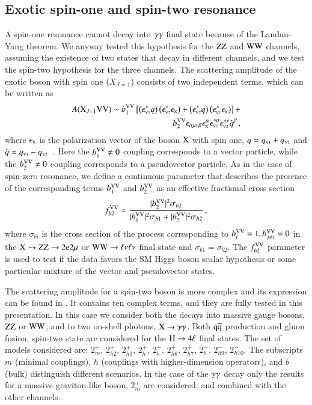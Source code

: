 \subsection{Exotic spin-one and spin-two resonance}
A spin-one resonance cannot decay into $\gamma\gamma$ final state because
of the Landau-Yang theorem. We anyway tested this hypothesis for the
$\mathrm{Z}\mathrm{Z}$ and $\mathrm{W}\mathrm{W}$ channels, assuming the existence of two states
that decay in different channels, and we test the spin-two hypothesis
for the three channels.  The scattering amplitude of the exotic boson
with spin one ($X_{J=1}$) consists of two independent terms, which can
be written as
%
\begin{eqnarray}
A(\mathrm{X}_{J=1} \mathrm{V}\mathrm{V}) \sim b_{1}^{\mathrm{V}\mathrm{V}}  \left[ \left(\epsilon_{\scriptscriptstyle\mathrm{V}1}^{*}q\right)\left(\epsilon_{\scriptscriptstyle\mathrm{V}2}^{*}\epsilon_{\scriptscriptstyle\mathrm{X}}\right) +
\left(\epsilon_{\scriptscriptstyle\mathrm{V}2}^{*}q\right)\left(\epsilon_{\scriptscriptstyle\mathrm{V}1}^{*}\epsilon_{\scriptscriptstyle\mathrm{X}}\right) \right] + \\ \nonumber 
b_{2}^{\mathrm{V}\mathrm{V}}  \epsilon_{\alpha\mu\nu\beta}\epsilon_{\scriptscriptstyle\mathrm{X}}^{\alpha}\epsilon_{\scriptscriptstyle\mathrm{V}1}^{*\mu}\epsilon_{\scriptscriptstyle\mathrm{V}2}^{*\nu}{\tilde q}^{\beta} \,,
\label{eq:ampl-spin1} 
\end{eqnarray}
%
where $\epsilon_{\scriptscriptstyle\mathrm{X}}$ is the polarization vector of the boson $\mathrm{X}$
with spin one, ${q}=q_{\scriptscriptstyle\mathrm{V}1}+q_{\scriptscriptstyle\mathrm{V}2}$ and ${\tilde
  q}=q_{\scriptscriptstyle\mathrm{V}1}-q_{\scriptscriptstyle\mathrm{V}2}$~\cite{Gao:2010qx, Bolognesi:2012mm}.
Here the $b_{1}^{\mathrm{V}\mathrm{V}} \neq 0$ coupling corresponds to a vector
particle, while the $b_{2}^{\mathrm{V}\mathrm{V}}\neq 0$ coupling corresponds to a
pseudovector particle.
As in the case of spin-zero resonance, we define a continuous parameter
that describes the presence of the corresponding terms $b_{1}^{\mathrm{V}\mathrm{V}} $ and 
$b_{2}^{\mathrm{V}\mathrm{V}}$ as an effective fractional cross section
%
\begin{eqnarray}
f_{b2}^{\mathrm{V}\mathrm{V}}  = \frac{|b_{2}^{\mathrm{V}\mathrm{V}} |^2 \sigma_{b2}}{|b_{1}^{\mathrm{V}\mathrm{V}} |^2 \sigma_{b1} + |b_{2}^{\mathrm{V}\mathrm{V}}|^2 \sigma_{b2}} \,,
\label{eq:fa_definitions_spin1}
\end{eqnarray}
%
where $\sigma_{bi}$ is the cross section of the process corresponding 
to $b_{i}^{\mathrm{V}\mathrm{V}}  = 1, b^{\mathrm{V}\mathrm{V}}_{j \neq i} = 0$ in the 
$\mathrm{X}\to\mathrm{Z}\mathrm{Z}\to2\mathrm{e}2\mu$ or $\mathrm{W}\mathrm{W}\to\ell\nu\ell\nu$ final state and $\sigma_{b1} = \sigma_{b2}$.
The $f_{b2}^{\mathrm{V}\mathrm{V}}$ parameter is used to test if the data favors the SM Higgs boson 
scalar hypothesis or some particular mixture of the vector and pseudovector states.

The scattering amplitude for a spin-two boson is more complex and its
expression can be found in \cite{PASICHEP14}.  It contains ten complex
terms, and they are fully tested in this presentation.  In this case
we consider both the decays into massive gauge bosons, $\mathrm{Z}\mathrm{Z}$ or
$\mathrm{W}\mathrm{W}$, and to two on-shell photons, $\mathrm{X}\to\gamma\gamma$. Both $\mathrm{\mathrm{q}\mathrm{\overline{q}}}$
production and gluon fusion, spin-two state are considered for the
$\mathrm{H}\to4\ell$ final states. The set of models considered are:
$2_m^+$, $2_{h2}^+$, $2_{h3}^+$, $2_h^+$, $2_b^+$, $2_{h6}^+$,
$2_{h7}^+$, $2_h^-$, $2_{h9}^-$, $2_{h10}^-$.  The subscripts $m$
(minimal couplings), $h$ (couplings with higher-dimension operators),
and $b$ (bulk) distinguish different scenarios.  In the case of the
$\gamma\gamma$ decay only the results for a massive graviton-like boson,
$2_m^+$ are considered, and combined with the other channels.
